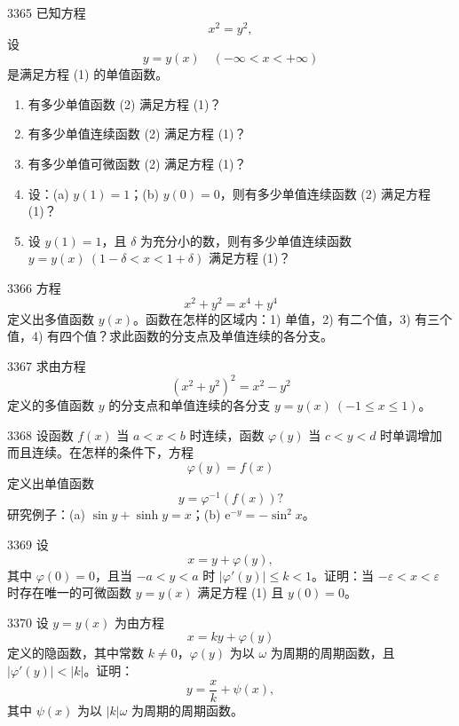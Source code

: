\begin{prob}[L]{3365}
已知方程
\[
x^2 = y^2, \tag{1}
\]
设
\[
y = y(x) \quad (-\infty < x < +\infty) \tag{2}
\]
是满足方程 (1) 的单值函数。
\begin{enumerate}[label=\arabic*), itemsep=2pt, topsep=3pt]
  \item 有多少单值函数 (2) 满足方程 (1)？
  \item 有多少单值连续函数 (2) 满足方程 (1)？
  \item 有多少单值可微函数 (2) 满足方程 (1)？
  \item 设：(a) $y(1) = 1$；(b) $y(0) = 0$，则有多少单值连续函数 (2) 满足方程 (1)？
  \item 设 $y(1) = 1$，且 $\delta$ 为充分小的数，则有多少单值连续函数 $y = y(x)\ (1 - \delta < x < 1 + \delta)$ 满足方程 (1)？
\end{enumerate}
\end{prob}

\begin{prob}[L]{3366}
方程
\[
x^2 + y^2 = x^4 + y^4
\]
定义出多值函数 $y(x)$。函数在怎样的区域内：1) 单值，2) 有二个值，3) 有三个值，4) 有四个值？求此函数的分支点及单值连续的各分支。
\end{prob}

\begin{prob}[M]{3367}
求由方程
\[
(x^2 + y^2)^2 = x^2 - y^2
\]
定义的多值函数 $y$ 的分支点和单值连续的各分支 $y = y(x)\ (-1 \leqslant x \leqslant 1)$。
\end{prob}

\begin{prob}[L]{3368}
设函数 $f(x)$ 当 $a < x < b$ 时连续，函数 $\varphi(y)$ 当 $c < y < d$ 时单调增加而且连续。在怎样的条件下，方程
\[
\varphi(y) = f(x)
\]
定义出单值函数
\[
y = \varphi^{-1}(f(x))?
\]
研究例子：(a) $\sin y + \sinh y = x$；\qquad (b) $\mathrm{e}^{-y} = -\sin^2 x$。
\end{prob}

\begin{prob}[M]{3369}
设
\[
x = y + \varphi(y), \tag{1}
\]
其中 $\varphi(0) = 0$，且当 $-a < y < a$ 时 $|\varphi'(y)| \leqslant k < 1$。证明：当 $-\varepsilon < x < \varepsilon$ 时存在唯一的可微函数 $y = y(x)$ 满足方程 (1) 且 $y(0) = 0$。
\end{prob}

\begin{prob}[M]{3370}
设 $y = y(x)$ 为由方程
\[
x = ky + \varphi(y)
\]
定义的隐函数，其中常数 $k \neq 0$，$\varphi(y)$ 为以 $\omega$ 为周期的周期函数，且 $|\varphi'(y)| < |k|$。证明：
\[
y = \frac{x}{k} + \psi(x),
\]
其中 $\psi(x)$ 为以 $|k|\omega$ 为周期的周期函数。
\end{prob}

